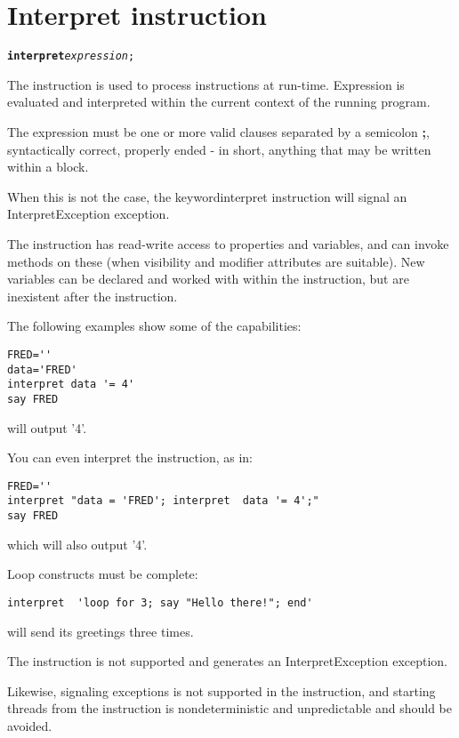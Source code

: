 \section{Interpret instruction}\label{refinterpret}
\index{}
\index{,}
\index{,}
\begin{shaded}
\begin{alltt}
\textbf{interpret} \emph{expression};

\end{alltt}
\end{shaded}

The  instruction is used to process instructions at run-time.
Expression is evaluated and interpreted within the current context of the running program.

The expression must be one or more valid clauses separated by a semicolon \textbf{;}, syntactically correct, properly ended - in short,
anything that may be written within a  block.

When this is not the case, the keyword{interpret} instruction will signal an InterpretException exception.

The  instruction has read-write access to properties and variables, and can invoke methods
on these (when visibility and modifier attributes are suitable). New variables can be declared and worked with within
the  instruction, but are inexistent after the instruction.

The following examples show some of the capabilities:

\begin{lstlisting}
FRED=''
data='FRED'
interpret data '= 4'
say FRED
\end{lstlisting}
will output '4'.

You can even interpret the  instruction, as in:

\begin{lstlisting}
FRED=''
interpret "data = 'FRED'; interpret  data '= 4';"
say FRED
\end{lstlisting}
which will also output '4'.

Loop constructs must be complete:

\begin{lstlisting}
interpret  'loop for 3; say "Hello there!"; end'
\end{lstlisting}
will send its greetings three times.

The  instruction is not supported and generates an InterpretException exception.

Likewise, signaling exceptions is not supported in the  instruction, and starting threads from the instruction
is nondeterministic and unpredictable and should be avoided.

